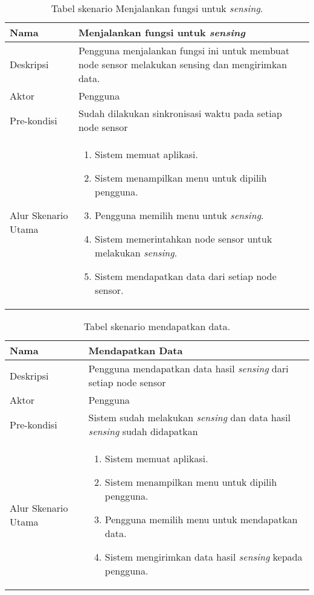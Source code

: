 \begin{table}[htbp]
    \centering
    \begin{tabular}{|p{3cm}|p{10cm}|}
    \hline
        Nama & Menjalankan fungsi untuk \textit{sensing}\\
    \hline
    \hline
        Deskripsi & Pengguna menjalankan fungsi ini untuk membuat node sensor melakukan sensing dan mengirimkan data.\\
    \hline
        Aktor & Pengguna \\
    \hline
        Pre-kondisi & Sudah dilakukan sinkronisasi waktu pada setiap node sensor\\
    \hline
        Alur Skenario Utama & 
        \begin{enumerate}
            \item Sistem memuat aplikasi.
            \item Sistem menampilkan menu untuk dipilih pengguna.
            \item Pengguna memilih menu untuk \textit{sensing}.
            \item Sistem memerintahkan node sensor untuk melakukan \textit{sensing}.
            \item Sistem mendapatkan data dari setiap node sensor.
        \end{enumerate}\\
    \hline
    \end{tabular}
    \caption{Tabel skenario Menjalankan fungsi untuk \textit{sensing}.}
    \label{tab:skenario2}
\end{table}

\begin{table}[htbp]
    \centering
    \begin{tabular}{|p{3cm}|p{10cm}|}
    \hline
        Nama & Mendapatkan Data\\
    \hline
    \hline
        Deskripsi & Pengguna mendapatkan data hasil \textit{sensing} dari setiap node sensor\\
    \hline
        Aktor & Pengguna \\
    \hline
        Pre-kondisi & Sistem sudah melakukan \textit{sensing} dan data hasil \textit{sensing} sudah didapatkan \\
    \hline
        Alur Skenario Utama & 
        \begin{enumerate}
            \item Sistem memuat aplikasi.
            \item Sistem menampilkan menu untuk dipilih pengguna.
            \item Pengguna memilih menu untuk mendapatkan data.
            \item Sistem mengirimkan data hasil \textit{sensing} kepada pengguna.
        \end{enumerate}\\
    \hline
    \end{tabular}
    \caption{Tabel skenario mendapatkan data.}
    \label{tab:skenario3}
\end{table}

